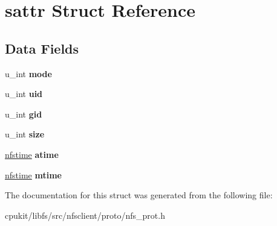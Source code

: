 \hypertarget{structsattr}{}\section{sattr Struct Reference}
\label{structsattr}
\subsection*{Data Fields}
\begin{DoxyCompactItemize}
\item 
\mbox{\label{structsattr_ad91b1eb59823681cc374ecd3afd60b26}} 
u\+\_\+int {\bfseries mode}
\item 
\mbox{\label{structsattr_ae36a9b5ce3d220218a1f61f8bdadc0ad}} 
u\+\_\+int {\bfseries uid}
\item 
\mbox{\label{structsattr_ab6fd6c1502db5c5e0bd891cfa61bcc8d}} 
u\+\_\+int {\bfseries gid}
\item 
\mbox{\label{structsattr_af8de9bfed97771ddd04683cb3fa26f81}} 
u\+\_\+int {\bfseries size}
\item 
\mbox{\label{structsattr_a26c6202c871a38d2695f93391ec98ce9}} 
\mbox{\hyperlink{structnfstime}{nfstime}} {\bfseries atime}
\item 
\mbox{\label{structsattr_a652b33a013bea16b3e99b264d37a415a}} 
\mbox{\hyperlink{structnfstime}{nfstime}} {\bfseries mtime}
\end{DoxyCompactItemize}


The documentation for this struct was generated from the following file\+:\begin{DoxyCompactItemize}
\item 
cpukit/libfs/src/nfsclient/proto/nfs\+\_\+prot.\+h\end{DoxyCompactItemize}
